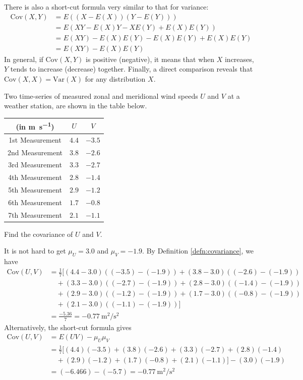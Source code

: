 There is also a short-cut formula very similar to that for variance:
\begin{align*}
\text{Cov}(X,Y) &= E((X-E(X))(Y-E(Y))) \\
&= E(XY - E(X)Y - XE(Y) + E(X)E(Y)) \\
&= E(XY) - E(X)E(Y) - E(X)E(Y) + E(X)E(Y) \\
&= E(XY) - E(X)E(Y) 
\end{align*}
In general, if $\text{Cov}(X,Y)$ is positive (negative), it means that when $X$ increases, $Y$ tends to increase (decrease) together. Finally, a direct comparison reveals that $\text{Cov}(X,X) = \text{Var}(X)$ for any distribution $X$. 

\begin{exmp}
Two time-series of measured zonal and meridional wind speeds $U$ and $V$ at a weather station, are shown in the table below.
\begin{center}
\begin{tabular}{|c|c|c|}
\hline
(in \si{\m \per \s}) & $U$ & $V$\\
\hline
1st Measurement & $4.4$ & $-3.5$ \\
\hline
2nd Measurement & $3.8$ & $-2.6$ \\
\hline
3rd Measurement & $3.3$ & $-2.7$ \\
\hline
4th Measurement & $2.8$ & $-1.4$ \\
\hline
5th Measurement & $2.9$ & $-1.2$ \\
\hline
6th Measurement & $1.7$ & $-0.8$ \\
\hline
7th Measurement & $2.1$ & $-1.1$ \\
\hline
\end{tabular}
\end{center}
Find the covariance of $U$ and $V$.
\end{exmp}
\begin{solution}
It is not hard to get $\mu_U = 3.0$ and $\mu_V = -1.9$. By Definition \ref{defn:covariance}, we have
\begin{align*}
\text{Cov}(U,V) &= \frac{1}{7} [(4.4-3.0)((-3.5)-(-1.9))+(3.8-3.0)((-2.6)-(-1.9)) \\
&\quad+(3.3-3.0)((-2.7)-(-1.9))+(2.8-3.0)((-1.4)-(-1.9)) \\
&\quad+(2.9-3.0)((-1.2)-(-1.9))+(1.7-3.0)((-0.8)-(-1.9)) \\
&\quad+(2.1-3.0)((-1.1)-(-1.9))] \\
&= \frac{-5.36}{7} = \SI{-0.77}{\square\m \per \square\s}
\end{align*}
Alternatively, the short-cut formula gives
\begin{align*}
\text{Cov}(U,V) &= E(UV) - \mu_U \mu_V \\
&= \frac{1}{7}[(4.4)(-3.5) + (3.8)(-2.6) + (3.3)(-2.7) + (2.8)(-1.4) \\
&\quad + (2.9)(-1.2) + (1.7)(-0.8) + (2.1)(-1.1)] - (3.0)(-1.9) \\
&= (-6.466) - (-5.7) = \SI{-0.77}{\square\m \per \square\s}
\end{align*}
\end{solution}
